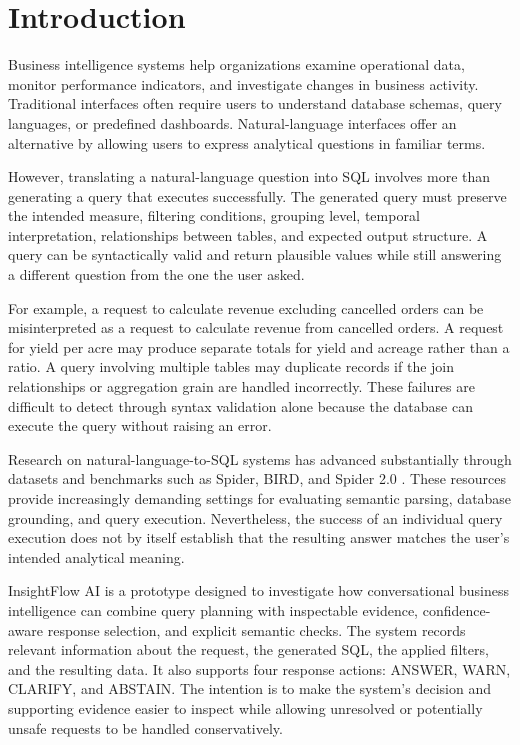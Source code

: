 \documentclass[conference]{IEEEtran}
\begin{document}
\section{Introduction}

Business intelligence systems help organizations examine operational data, monitor performance indicators, and investigate changes in business activity. Traditional interfaces often require users to understand database schemas, query languages, or predefined dashboards. Natural-language interfaces offer an alternative by allowing users to express analytical questions in familiar terms.

However, translating a natural-language question into SQL involves more than generating a query that executes successfully. The generated query must preserve the intended measure, filtering conditions, grouping level, temporal interpretation, relationships between tables, and expected output structure. A query can be syntactically valid and return plausible values while still answering a different question from the one the user asked.

For example, a request to calculate revenue excluding cancelled orders can be misinterpreted as a request to calculate revenue from cancelled orders. A request for yield per acre may produce separate totals for yield and acreage rather than a ratio. A query involving multiple tables may duplicate records if the join relationships or aggregation grain are handled incorrectly. These failures are difficult to detect through syntax validation alone because the database can execute the query without raising an error.

Research on natural-language-to-SQL systems has advanced substantially through datasets and benchmarks such as Spider, BIRD, and Spider 2.0 \cite{yu2018spider,li2023bird,lei2025spider2}. These resources provide increasingly demanding settings for evaluating semantic parsing, database grounding, and query execution. Nevertheless, the success of an individual query execution does not by itself establish that the resulting answer matches the user's intended analytical meaning.

InsightFlow AI is a prototype designed to investigate how conversational business intelligence can combine query planning with inspectable evidence, confidence-aware response selection, and explicit semantic checks. The system records relevant information about the request, the generated SQL, the applied filters, and the resulting data. It also supports four response actions: ANSWER, WARN, CLARIFY, and ABSTAIN. The intention is to make the system's decision and supporting evidence easier to inspect while allowing unresolved or potentially unsafe requests to be handled conservatively.
\end{document}
